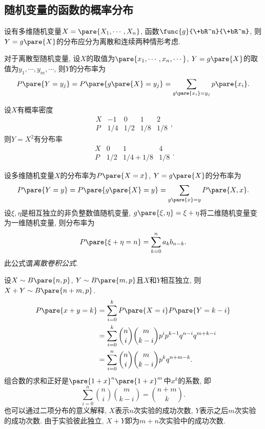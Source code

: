 \documentclass[../Statistics.tex]{subfiles}
\begin{document}


\subsection{随机变量的函数的概率分布} %
\label{sub:随机变量的函数的概率分布}

设有多维随机变量$X=\pare{X_1,\cdots,X_n}$, 函数$\func{g}{\+bR^n}{\+bR^m}$, 则$Y = g\pare{X}$的分布应分为离散和连续两种情形考虑.
\par
对于离散型随机变量, 设$X$的取值为$\pare{x_1,\cdots,x_n,\cdots}$, $Y=g\pare{X}$的取值为$y_1,\cdots, y_m,\cdots$, 则$Y$的分布率为
\[ P\pare{Y=y_j} = P\pare{g\pare{X} = y_j} = \sum_{g\pare{x_i} = y_j} p\pare{x_i}. \]
\begin{sample}
    \begin{ex}
        设$X$有概率密度
        \[ \begin{array}{ccccc}
            X & -1 & 0 & 1 & 2 \\
            P & 1/4 & 1/2 & 1/8 & 1/8
        \end{array}, \]
        则$Y=X^2$有分布率
        \[ \begin{array}{cccc}
            X & 0 & 1 &  4 \\
            P & 1/2 & 1/4+1/8 & 1/8
        \end{array}. \]
    \end{ex}
\end{sample}
设多维随机变量$X$的分布率为$P\pare{X=x}$, $Y=g\pare{X}$的分布率为
\[ P\pare{Y=y} = P\pare{g\pare{X} =y} = \sum_{g\pare{x} = y} P\pare{X,x}. \]
设$\xi,\eta$是相互独立的非负整数值随机变量, $g\pare{\xi,\eta} = \xi+\eta$将二维随机变量变为一维随机变量, 则分布率为
\[ P\pare{\xi + \eta = n} = \sum_{k=0}^n a_kb_{n-k}. \]
此公式谓\emph{离散卷积公式}.
\begin{sample}
    \begin{ex}
        设$X\sim B\pare{n,p}$, $Y\sim B\pare{m,p}$且$X$和$Y$相互独立, 则$X+Y\sim B\pare{n+m,p}$.
        \begin{align*}
            P\pare{x+y = k} &= \sum_{i=0}^k P\pare{X=i}P\pare{Y=k-i} \\
            &= \sum_{i=0}^k \binom{n}{i}\binom{m}{k-i} p^ip^{k-1} q^{n-i}q^{m+k-i} \\
            &= \sum_{i=0}^n \binom{n}{i}\binom{m}{k-i} p^k q^{n+m-k}.
        \end{align*}
        组合数的求和正好是$\pare{1+x}^n\pare{1+x}^m$中$x^k$的系数, 即
        \[ \sum_{i=0}^n \binom{n}{i}\binom{m}{k-i} = \binom{n+m}{k}. \]
        也可以通过二项分布的意义解释, $X$表示$n$次实验的成功次数, $Y$表示之后$m$次实验的成功次数. 由于实验彼此独立, $X+Y$即为$m+n$次实验中的成功次数.
    \end{ex}
\end{sample}
\end{document}
